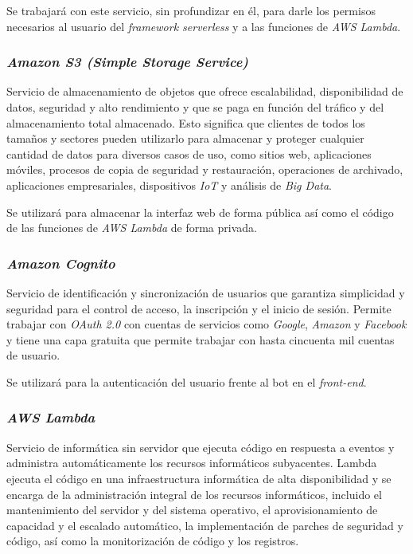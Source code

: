 \documentclass[11pt,spanish,listoffigures]{tfgetsinf}
\begin{document}
Se trabajará con este servicio, sin profundizar en él, para darle los permisos necesarios al usuario del \textit{framework serverless} y a las funciones de \textit{AWS Lambda}. 

\subsubsection{\textit{Amazon S3 (Simple Storage Service)}}

Servicio de almacenamiento de objetos que ofrece escalabilidad, disponibilidad de datos, seguridad y alto rendimiento y que se paga en función del tráfico y del almacenamiento total almacenado. Esto significa que clientes de todos los tamaños y sectores pueden utilizarlo para almacenar y proteger cualquier cantidad de datos para diversos casos de uso, como sitios web, aplicaciones móviles, procesos de copia de seguridad y restauración, operaciones de archivado, aplicaciones empresariales, dispositivos \textit{IoT} y análisis de \textit{Big Data}.

Se utilizará para almacenar la interfaz web de forma pública así como el código de las funciones de \textit{AWS Lambda} de forma privada.

\subsubsection{\textit{Amazon Cognito}}

Servicio de identificación y sincronización de usuarios que garantiza simplicidad y seguridad para el control de acceso, la inscripción y el inicio de sesión. Permite trabajar con \textit{OAuth 2.0} con cuentas de servicios como \textit{Google}, \textit{Amazon} y \textit{Facebook} y tiene una capa gratuita que permite trabajar con hasta cincuenta mil cuentas de usuario.

Se utilizará para la autenticación del usuario frente al bot en el \textit{front-end}.

\subsubsection{\textit{AWS Lambda}}

Servicio de informática sin servidor que ejecuta código en respuesta a eventos y administra automáticamente los recursos informáticos subyacentes. Lambda ejecuta el código en una infraestructura informática de alta disponibilidad y se encarga de la administración integral de los recursos informáticos, incluido el mantenimiento del servidor y del sistema operativo, el aprovisionamiento de capacidad y el escalado automático, la implementación de parches de seguridad y código, así como la monitorización de código y los registros.
\end{document}
